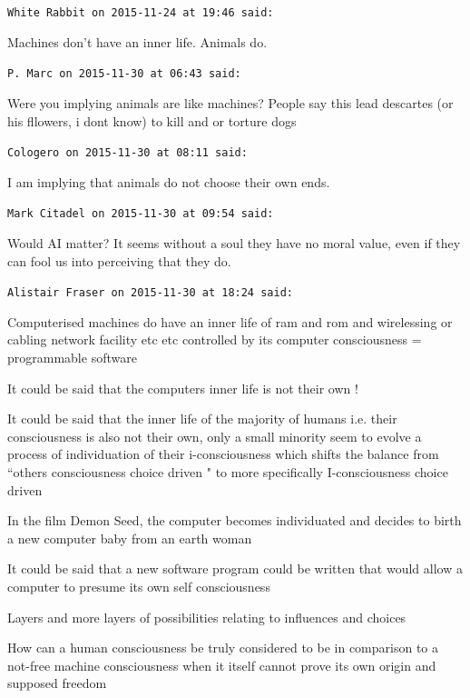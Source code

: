 \begin{footnotesize}\begin{sffamily}



\texttt{White Rabbit on 2015-11-24 at 19:46 said: }

Machines don't have an inner life. Animals do.


\hfill

\texttt{P. Marc on 2015-11-30 at 06:43 said: }

Were you implying animals are like machines? People say this lead descartes (or his fllowers, i dont know) to kill and
or torture dogs


\hfill

\texttt{Cologero on 2015-11-30 at 08:11 said: }

I am implying that animals do not choose their own ends.


\hfill

\texttt{Mark Citadel on 2015-11-30 at 09:54 said: }

Would AI matter? It seems without a soul they have no moral value, even if they can fool us into perceiving that they
do.


\hfill

\texttt{Alistair Fraser on 2015-11-30 at 18:24 said: }

Computerised machines do have an inner life of ram and rom and wirelessing or cabling network facility etc etc
controlled by its computer consciousness = programmable software

It could be said that the computers inner life is not their own !

It could be said that the inner life of the majority of humans i.e. their consciousness is also not their own, only a
small minority seem to evolve a process of individuation of their i-consciousness which shifts the balance from ``others
consciousness choice driven " to more specifically I-consciousness choice driven

In the film Demon Seed, the computer becomes individuated and decides to birth a new computer baby from an earth
woman

It could be said that a new software program could be written that would allow a computer to presume its own self
consciousness 

Layers and more layers of possibilities relating to influences and choices 

How can a human consciousness be truly considered to be in comparison to a not-free machine consciousness when it itself
cannot prove its own origin and supposed freedom 


\end{sffamily}
\end{footnotesize}
